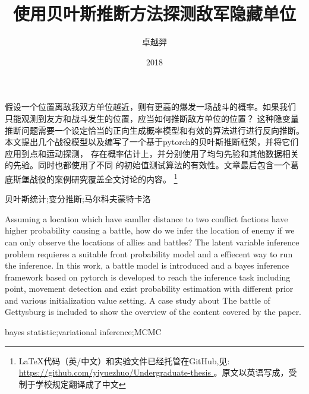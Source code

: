 \documentclass{sicnuthesis}
\title{使用贝叶斯推断方法探测敌军隐藏单位}
\author{卓越羿}
\date{2018}
\begin{document}
\frontmatter %

\maketitle

\clearpage

\begin{abstractch}

假设一个位置离敌我双方单位越近，则有更高的爆发一场战斗的概率。如果我们
只能观测到友方和战斗发生的位置，应当如何推断敌方单位的位置？
这种隐变量推断问题需要一个设定恰当的正向生成概率模型和有效的算法进行进行反向推断。
本文提出几个战役模型以及编写了一个基于pytorch的贝叶斯推断框架，并将它们应用到点和运动探测，
存在概率估计上，并分别使用了均匀先验和其他数据相关的先验。同时也都使用了不同
的初始值测试算法的有效性。文章最后包含一个葛底斯堡战役的案例研究覆盖全文讨论的内容。
\footnote{LaTeX代码（英/中文）和实验文件已经托管在GitHub,见: \url{ https://github.com/yiyuezhuo/Undergraduate-thesis } 。原文以英语写成，受制于学校规定翻译成了中文}

\end{abstractch}

\begin{keywordsch}贝叶斯统计;变分推断;马尔科夫蒙特卡洛\end{keywordsch}

\clearpage


\begin{abstracten}

Assuming a location which have samller distance to two conflict factions have higher probability causing a battle,
how do we infer the location of enemy if we can only observe the locations of allies and battles? 
The latent variable inference problem requieres a suitable front probability model and a effiecent way to run the 
inference. In this work, a battle model is introduced and a bayes inference framework based on pytorch 
is developed to reach the inference task including point, movement detection and 
exist probability estimation with different prior and various initialization value setting.
A case study about The battle of Gettysburg is included to show the overview of the content covered by the paper.

\end{abstracten}

\begin{keywordsen}bayes statistic;variational inference;MCMC\end{keywordsen}
\end{document}
